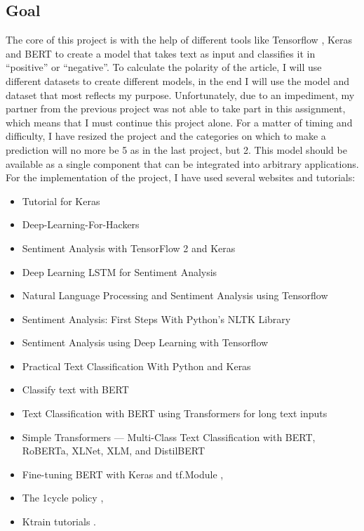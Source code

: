 \subsection[Goal]{Goal}
\label{chap:intro_goal}
The core of this project is with the help of different tools like Tensorflow \cite{tensorflow}, Keras \cite{noauthor_keras_nodate} and BERT \cite{devlin_bert_2019} to create a model that takes text as input and classifies it in “positive” or “negative”. 
To calculate the polarity of the article, I will use different datasets to create different models, in the end I will use the model and dataset that most reflects my purpose.
Unfortunately, due to an impediment, my partner from the previous project was not able to take part in this assignment, which means that I must continue this project alone.
For a matter of timing and difficulty, I have resized the project and the categories on which to make a prediction will no more be 5 as in the last project, but 2.
This model should be available as a single component that can be integrated into arbitrary applications.\\
For the implementation of the project, I have used several websites and tutorials:
\begin{itemize}
    \item Tutorial for Keras \cite{tutorial_keras}
    \item Deep-Learning-For-Hackers \cite{git}
    \item Sentiment Analysis with TensorFlow 2 and Keras \cite{tutorial}
    \item Deep Learning LSTM for Sentiment Analysis \cite{karikari_deep_2020}
    \item Natural Language Processing and Sentiment Analysis using Tensorflow \cite{khan_natural_2020}
    \item Sentiment Analysis: First Steps With Python's NLTK Library \cite{python_sentiment_nodate}
    \item Sentiment Analysis using Deep Learning with Tensorflow \cite{pandey_sentiment_2020}
    \item Practical Text Classification With Python and Keras \cite{python_practical_nodate}
    \item Classify text with BERT \cite{noauthor_classify_nodate}
    \item Text Classification with BERT using Transformers for long text inputs \cite{girdhar_text_2020}
    \item Simple Transformers — Multi-Class Text Classification with BERT, RoBERTa, XLNet, XLM, and DistilBERT \cite{rajapakse_simple_2019}
    \item Fine-tuning BERT with Keras and tf.Module \cite{antyukhov_fine-tuning_2020},
    \item The 1cycle policy \cite{gugger_1cycle_nodate},
    \item Ktrain tutorials \cite{maiya_amaiyaktrain_2021}.
\end{itemize}


